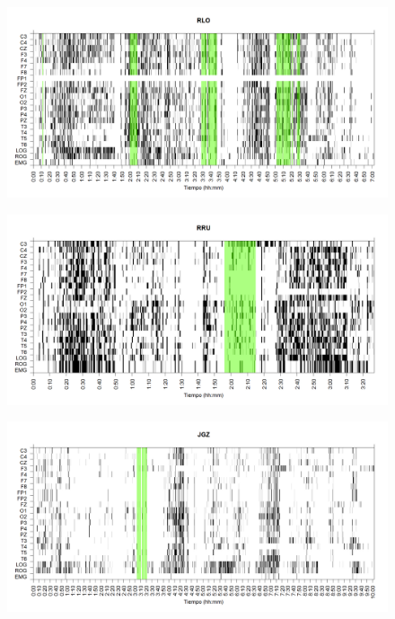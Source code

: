 \documentclass[12pt,a4paper]{mitthesis}
\begin{document}
\begin{figure}
\centering
\includegraphics[width=0.8\linewidth]
{./g170413/RLMN10SUE_est.png} 
\label{grf_RLO}
\end{figure}

\begin{figure}
\centering
\includegraphics[width=0.8\linewidth]
{./g170413/RRMNS_est.png} 
\label{grf_RRU}
\end{figure}

\begin{figure}
\centering
\includegraphics[width=0.8\linewidth]
{./g170413/JGMN6SUE_est.png} 
\label{grf_JGZ}
\end{figure}


\end{document}
